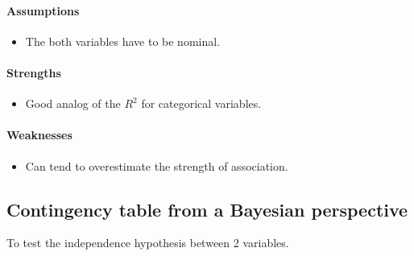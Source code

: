 \paragraph{Assumptions}
\begin{itemize}
    \item The both variables have to be nominal.
\end{itemize}

\paragraph{Strengths}
\begin{itemize}
    \item Good analog of the $R^{2}$ for categorical variables.
\end{itemize}

\paragraph{Weaknesses}
\begin{itemize}
    \item Can tend to overestimate the strength of association.
\end{itemize}



\subsection{Contingency table from a Bayesian perspective}
To test the independence hypothesis between 2 variables.
